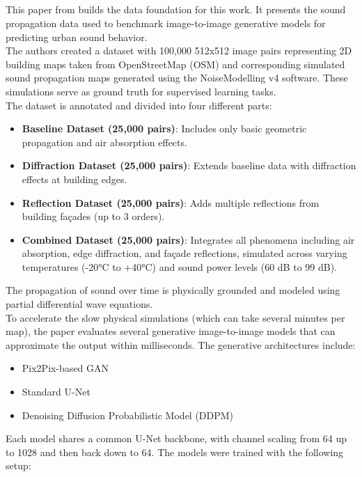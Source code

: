 		\subsection{}
			This paper from \citeauthor{spitznagel_urban_2024-1} builds the data foundation for this work. It presents the sound propagation data used to benchmark image-to-image generative models for predicting urban sound behavior.\\
			The authors created a dataset with 100{,}000 512x512 image pairs representing 2D building maps taken from OpenStreetMap (OSM) and corresponding simulated sound propagation maps generated using the NoiseModelling v4 software. These simulations serve as ground truth for supervised learning tasks.\\
			The dataset is annotated and divided into four different parts:
			\begin{itemize}
				\item \textbf{Baseline Dataset (25{,}000 pairs)}: Includes only basic geometric propagation and air absorption effects.
				\item \textbf{Diffraction Dataset (25{,}000 pairs)}: Extends baseline data with diffraction effects at building edges.
				\item \textbf{Reflection Dataset (25{,}000 pairs)}: Adds multiple reflections from building façades (up to 3 orders).
				\item \textbf{Combined Dataset (25{,}000 pairs)}: Integrates all phenomena including air absorption, edge diffraction, and façade reflections, simulated across varying temperatures (-20°C to +40°C) and sound power levels (60 dB to 99 dB).
			\end{itemize}
			The propagation of sound over time is physically grounded and modeled using partial differential wave equations.\\
			To accelerate the slow physical simulations (which can take several minutes per map), the paper evaluates several generative image-to-image models that can approximate the output within milliseconds. The generative architectures include:
			\begin{itemize}
				\item Pix2Pix-based GAN
				\item Standard U-Net
				\item Denoising Diffusion Probabilistic Model (DDPM)
			\end{itemize}
			Each model shares a common U-Net backbone, with channel scaling from 64 up to 1028 and then back down to 64. The models were trained with the following setup:
